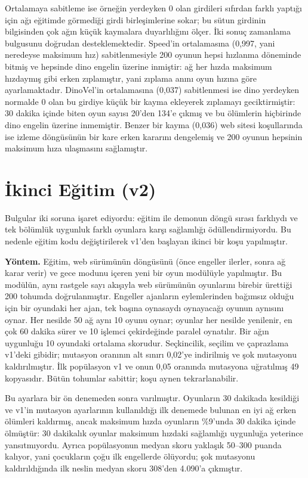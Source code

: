 \documentclass[11pt,a4paper]{article}
\begin{document}
Ortalamaya sabitleme ise örneğin yerdeyken 0 olan girdileri sıfırdan farklı yaptığı için ağı eğitimde görmediği girdi birleşimlerine sokar; bu sütun girdinin bilgisinden çok ağın küçük kaymalara duyarlılığını ölçer. İki sonuç zamanlama bulgusunu doğrudan desteklemektedir. Speed'in ortalamasına (0,997, yani neredeyse maksimum hız) sabitlenmesiyle 200 oyunun hepsi hızlanma döneminde bitmiş ve hepsinde dino engelin üzerine inmiştir: ağ her hızda maksimum hızdaymış gibi erken zıplamıştır, yani zıplama anını oyun hızına göre ayarlamaktadır. DinoVel'in ortalamasına (0,037) sabitlenmesi ise dino yerdeyken normalde 0 olan bu girdiye küçük bir kayma ekleyerek zıplamayı geciktirmiştir: 30 dakika içinde biten oyun sayısı 20'den 134'e çıkmış ve bu ölümlerin hiçbirinde dino engelin üzerine inmemiştir. Benzer bir kayma (0,036) web sitesi koşullarında ise izleme döngüsünün bir kare erken kararını dengelemiş ve 200 oyunun hepsinin maksimum hıza ulaşmasını sağlamıştır.

\section{İkinci Eğitim (v2)}
\label{sec:v2}

Bulgular iki soruna işaret ediyordu: eğitim ile demonun döngü sırası farklıydı ve tek bölümlük uygunluk farklı oyunlara karşı sağlamlığı ödüllendirmiyordu. Bu nedenle eğitim kodu değiştirilerek v1'den başlayan ikinci bir koşu yapılmıştır.

\textbf{Yöntem.} Eğitim, web sürümünün döngüsünü (önce engeller ilerler, sonra ağ karar verir) ve gece modunu içeren yeni bir oyun modülüyle yapılmıştır. Bu modülün, aynı rastgele sayı akışıyla web sürümünün oyunlarını birebir ürettiği 200 tohumda doğrulanmıştır. Engeller ajanların eylemlerinden bağımsız olduğu için bir oyundaki her ajan, tek başına oynasaydı oynayacağı oyunun aynısını oynar. Her nesilde 50 ağ aynı 10 oyunu oynar; oyunlar her nesilde yenilenir, en çok 60 dakika sürer ve 10 işlemci çekirdeğinde paralel oynatılır. Bir ağın uygunluğu 10 oyundaki ortalama skorudur. Seçkincilik, seçilim ve çaprazlama v1'deki gibidir; mutasyon oranının alt sınırı 0,02'ye indirilmiş ve şok mutasyonu kaldırılmıştır. İlk popülasyon v1 ve onun 0,05 oranında mutasyona uğratılmış 49 kopyasıdır. Bütün tohumlar sabittir; koşu aynen tekrarlanabilir.

Bu ayarlara bir ön denemeden sonra varılmıştır. Oyunların 30 dakikada kesildiği ve v1'in mutasyon ayarlarının kullanıldığı ilk denemede bulunan en iyi ağ erken ölümleri kaldırmış, ancak maksimum hızda oyunların \%9'unda 30 dakika içinde ölmüştür: 30 dakikalık oyunlar maksimum hızdaki sağlamlığı uygunluğa yeterince yansıtmıyordu. Ayrıca popülasyonun medyan skoru yaklaşık 50--300 puanda kalıyor, yani çocukların çoğu ilk engellerde ölüyordu; şok mutasyonu kaldırıldığında ilk neslin medyan skoru 308'den 4.090'a çıkmıştır.
\end{document}
